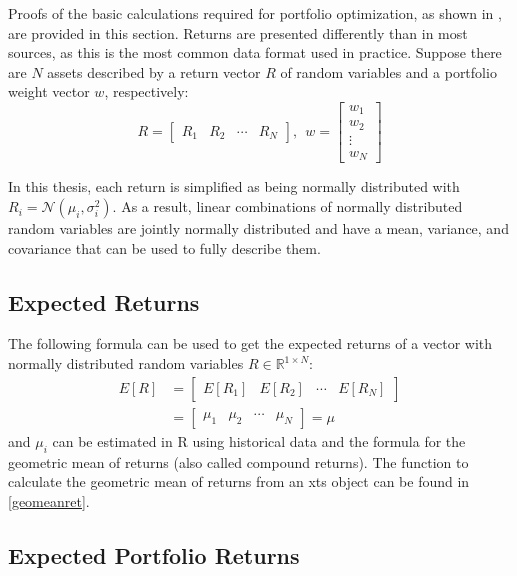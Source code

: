 \documentclass[
  oneside]{book}
\begin{document}
Proofs of the basic calculations required for portfolio optimization, as shown in \citep{Eric2021}, are provided in this section. Returns are presented differently than in most sources, as this is the most common data format used in practice. Suppose there are \(N\) assets described by a return vector \(R\) of random variables and a portfolio weight vector \(w\), respectively:
\[
  R = 
  \begin{bmatrix}
    R_{1} & R_{2} & \cdots & R_{N}  
 \end{bmatrix}
 , \ \ 
 w = 
  \begin{bmatrix}
    w_{1} \\ 
    w_{2} \\
    \vdots \\
    w_{N}  
 \end{bmatrix}
\]

In this thesis, each return is simplified as being normally distributed with \(R_i = \mathcal{N}(\mu_i, \sigma_i^2)\). As a result, linear combinations of normally distributed random variables are jointly normally distributed and have a mean, variance, and covariance that can be used to fully describe them.

\hypertarget{expected-returns}{%
\subsection{Expected Returns}\label{expected-returns}}

The following formula can be used to get the expected returns of a vector with normally distributed random variables \(R \in \mathbb{R}^{1\times N}\):
\begin{align*}
  E[R] &=
  \begin{bmatrix}
    E[R_{1}] & E[R_{2}] & \cdots & E[R_{N}]  
 \end{bmatrix}\\
 &=
 \begin{bmatrix}
    \mu_{1} & \mu_{2} & \cdots & \mu_{N} 
 \end{bmatrix}
 =
 \mu
\end{align*}
and \(\mu_i\) can be estimated in R using historical data and the formula for the geometric mean of returns (also called compound returns). The function to calculate the geometric mean of returns from an xts object can be found in \ref{geomeanret}.

\hypertarget{expected-portfolio-returns}{%
\subsection{Expected Portfolio Returns}\label{expected-portfolio-returns}}
\end{document}
